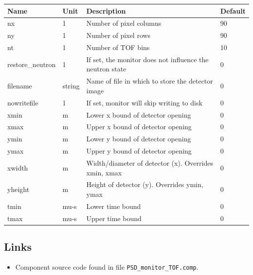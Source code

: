 \begin{longtable}{p{}p{}p{}p{}}
\toprule
\textbf{Name} & \textbf{Unit} & \textbf{Description} & \textbf{Default} \\
\midrule
\endhead
nx & 1 & Number of pixel columns & 90 \\
ny & 1 & Number of pixel rows & 90 \\
nt & 1 & Number of TOF bins & 10 \\
restore\_neutron & 1 & If set, the monitor does not influence the neutron state & 0 \\
filename & string & Name of file in which to store the detector image & 0 \\
nowritefile & 1 & If set, monitor will skip writing to disk & 0 \\
xmin & m & Lower x bound of detector opening & 0 \\
xmax & m & Upper x bound of detector opening & 0 \\
ymin & m & Lower y bound of detector opening & 0 \\
ymax & m & Upper y bound of detector opening & 0 \\
xwidth & m & Width/diameter of detector (x). Overrides xmin, xmax & 0 \\
yheight & m & Height of detector (y). Overrides ymin, ymax & 0 \\
tmin & mu-s & Lower time bound & 0 \\
tmax & mu-s & Upper time bound & 0 \\
\bottomrule
\end{longtable}

\subsection*{Links}
\begin{itemize}
  \item Component source code found in file \texttt{PSD\_monitor\_TOF.comp}.
\end{itemize}
